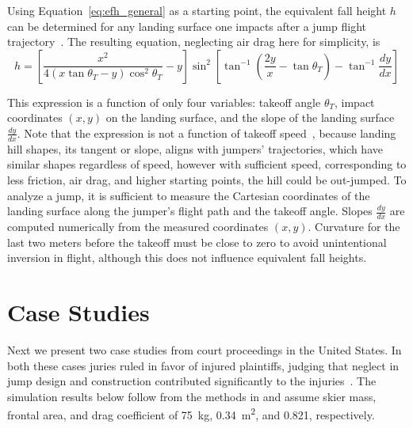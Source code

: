 \documentclass[smallextended]{svjour3}       %
\begin{document}
Using Equation~\ref{eq:efh_general} as a starting point, the equivalent fall
height $h$ can be determined for any landing surface one impacts after a jump
flight trajectory~\cite{Petrone2017}. The resulting equation, neglecting air
drag here for simplicity, is
%
\begin{equation}
  h = \left[\frac{x^2}{4(x\tan\theta_T - y)\cos^{2}\theta_T} -
    y\right]\sin^{2}\left[\tan^{-1}\left(\frac{2y}{x}- \tan\theta_T\right) -
    \tan^{-1}\frac{dy}{dx}\right]
  \label{eq:efh}
\end{equation}

This expression is  a function of only four variables: takeoff angle
$\theta_T$, impact coordinates $(x,y)$ on the landing surface, and the slope of
the landing surface $\frac{dy}{dx}$. Note that the expression is not a function
of takeoff speed~\cite{Petrone2017}, because landing hill shapes, its tangent or slope, aligns with jumpers' trajectories, which have similar shapes regardless of speed, however with sufficient speed, corresponding to less friction, air drag, and higher starting points, the hill could be out-jumped. To analyze a jump, it is sufficient to
measure the Cartesian coordinates of the landing surface along the jumper's
flight path and the takeoff angle. Slopes $\frac{dy}{dx}$ are computed
numerically from the measured coordinates $(x,y)$. Curvature for the last two meters before the takeoff must be close to zero to avoid unintentional inversion in flight, although this does not influence equivalent fall heights.



\section{Case Studies}
\label{sec:case}
%
Next we present two case studies from court proceedings in the United States.
In both these cases juries ruled in favor of injured plaintiffs, judging that
neglect in jump design and construction contributed significantly to the
injuries~\cite{Alvarado2002,Salvini2008}. The simulation results below follow
from the methods in \cite{Levy2015} and assume skier mass, frontal area, and
drag coefficient of 75~\si{\kg}, 0.34~\si{\meter\squared}, and 0.821,
respectively.
\end{document}
